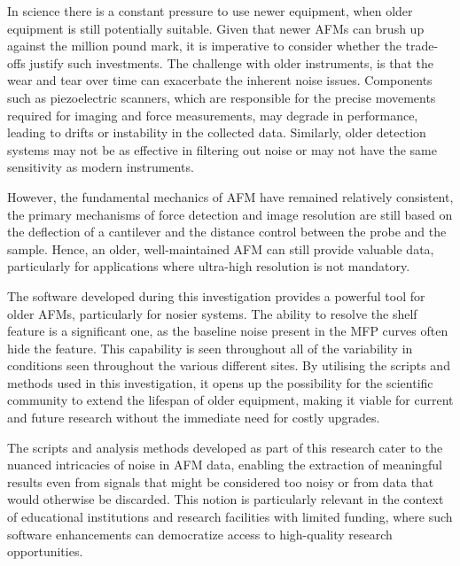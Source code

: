 In science there is a constant pressure to use newer equipment, when older equipment is still potentially suitable. Given that newer AFMs can brush up against the million pound mark, it is imperative to consider whether the trade-offs justify such investments. The challenge with older instruments, is that the wear and tear over time can exacerbate the inherent noise issues. Components such as piezoelectric scanners, which are responsible for the precise movements required for imaging and force measurements, may degrade in performance, leading to drifts or instability in the collected data. Similarly, older detection systems may not be as effective in filtering out noise or may not have the same sensitivity as modern instruments.

However, the fundamental mechanics of AFM have remained relatively consistent, the primary mechanisms of force detection and image resolution are still based on the deflection of a cantilever and the distance control between the probe and the sample. Hence, an older, well-maintained AFM can still provide valuable data, particularly for applications where ultra-high resolution is not mandatory.

The software developed during this investigation provides a powerful tool for older AFMs, particularly for nosier systems. The ability to resolve the shelf feature is a significant one, as the baseline noise present in the MFP curves often hide the feature. This capability is seen throughout all of the variability in conditions seen throughout the various different sites. By utilising the scripts and methods used in this investigation, it opens up the possibility for the scientific community to extend the lifespan of older equipment, making it viable for current and future research without the immediate need for costly upgrades.

The scripts and analysis methods developed as part of this research cater to the nuanced intricacies of noise in AFM data, enabling the extraction of meaningful results even from signals that might be considered too noisy or from data that would otherwise be discarded. This notion is particularly relevant in the context of educational institutions and research facilities with limited funding, where such software enhancements can democratize access to high-quality research opportunities. 

